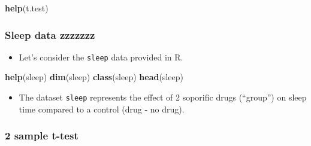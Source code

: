 \documentclass[]{article}
\newenvironment{Shaded}{\begin{snugshade}}{\end{snugshade}}
\newcommand{\KeywordTok}[1]{\textcolor[rgb]{0.13,0.29,0.53}{\textbf{#1}}}
\newcommand{\NormalTok}[1]{#1}
\providecommand{\tightlist}{%
  \setlength{\itemsep}{0pt}\setlength{\parskip}{0pt}}
\begin{document}
\begin{Shaded}
\begin{Highlighting}[]
\KeywordTok{help}\NormalTok{(t.test)}
\end{Highlighting}
\end{Shaded}

\hypertarget{sleep-data-zzzzzzz}{%
\subsubsection{Sleep data zzzzzzz}\label{sleep-data-zzzzzzz}}

\begin{itemize}
\tightlist
\item
  Let's consider the \texttt{sleep} data provided in R.
\end{itemize}

\begin{Shaded}
\begin{Highlighting}[]
\KeywordTok{help}\NormalTok{(sleep)}
\KeywordTok{dim}\NormalTok{(sleep)}
\KeywordTok{class}\NormalTok{(sleep)}
\KeywordTok{head}\NormalTok{(sleep)}
\end{Highlighting}
\end{Shaded}

\begin{itemize}
\tightlist
\item
  The dataset \texttt{sleep} represents the effect of 2 soporific drugs (``group'') on sleep time compared to a control (drug - no drug).
\end{itemize}

\hypertarget{sample-t-test-1}{%
\subsubsection{2 sample t-test}\label{sample-t-test-1}}
\end{document}
